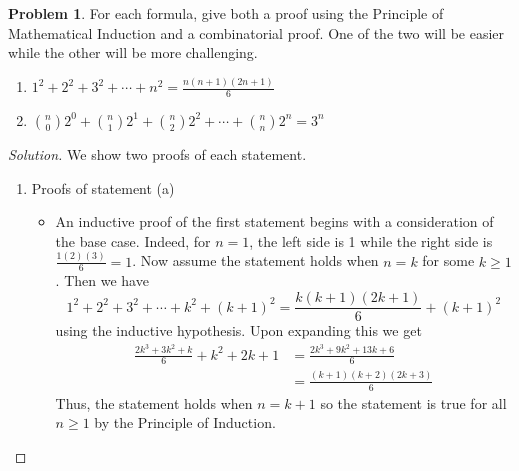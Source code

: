 \documentclass[12pt]{article}
\theoremstyle{definition}
\newtheorem{problem-internal}{Problem}[]
\newenvironment{problem}{
  \medskip
  \begin{problem-internal}
}{
\end{problem-internal}
}
\newenvironment{solution}{
  \begin{proof}[Solution]
    \vspace{-8px}
    \setlength{\parskip}{4px}
    \setlength{\parindent}{0px}
}{
\end{proof}
}
\begin{document}
  \begin{problem}
    For each formula, give both a proof using the Principle of Mathematical Induction and a combinatorial proof. One of the two will be easier while the other will be more challenging.
    \begin{enumerate}[label={(\alph*)}]
      \item $1^{2} + 2^{2} + 3^{2} + \cdots + n^{2} = \frac{n(n+1)(2n+1)}{6}$
      \item ${n \choose 0} 2^{0} + {n \choose 1} 2^{1} + {n \choose 2} 2^{2} + \cdots + {n \choose n} 2^{n} = 3^{n}$
    \end{enumerate}
  \end{problem}

  \begin{solution}
    We show two proofs of each statement.
    \begin{enumerate}[label={(\alph*)}]
      \item Proofs of statement (a)
      \begin{itemize}
        \item An inductive proof of the first statement begins with a consideration of the base case. Indeed, for \(n=1\), the left side is 1 while the right side is \(\frac{1(2)(3)}{6} = 1\). Now assume the statement holds when \(n = k\) for some \(k \geq 1\). Then we have
        \[
          1^2 + 2^2 + 3^2 + \cdots + k^2 + (k+1)^2 = \frac{k(k+1)(2k+1)}{6} + (k+1)^2
        \]
        using the inductive hypothesis. Upon expanding this we get
        \[
        \begin{split}
          \frac{2k^3 + 3k^2 + k}{6} + k^2 + 2k + 1 & = \frac{2k^3 + 9k^2 + 13k + 6}{6} \\
          & = \frac{(k+1)(k+2)(2k+3)}{6}
        \end{split}
        \]
        Thus, the statement holds when \(n=k+1\) so the statement is true for all \(n \geq 1\) by the Principle of Induction.


\end{itemize}
\end{enumerate}
\end{solution}
\end{document}
